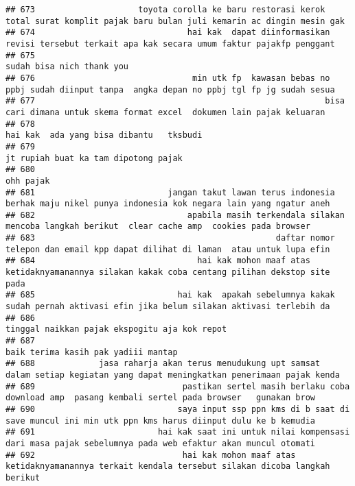 \documentclass[
]{article}
\begin{document}
\begin{verbatim}
## 673                     toyota corolla ke baru restorasi kerok total surat komplit pajak baru bulan juli kemarin ac dingin mesin gak
## 674                               hai kak  dapat diinformasikan revisi tersebut terkait apa kak secara umum faktur pajakfp penggant 
## 675                                                                                                        sudah bisa nich thank you
## 676                                min utk fp  kawasan bebas no ppbj sudah diinput tanpa  angka depan no ppbj tgl fp jg sudah sesua 
## 677                                                           bisa cari dimana untuk skema format excel  dokumen lain pajak keluaran
## 678                                                                                         hai kak  ada yang bisa dibantu   tksbudi
## 679                                                                                            jt rupiah buat ka tam dipotong pajak 
## 680                                                                                                                       ohh pajak 
## 681                           jangan takut lawan terus indonesia berhak maju nikel punya indonesia kok negara lain yang ngatur aneh 
## 682                               apabila masih terkendala silakan mencoba langkah berikut  clear cache amp  cookies pada browser   
## 683                                                 daftar nomor telepon dan email kpp dapat dilihat di laman  atau untuk lupa efin 
## 684                                 hai kak mohon maaf atas ketidaknyamanannya silakan kakak coba centang pilihan dekstop site pada 
## 685                             hai kak  apakah sebelumnya kakak sudah pernah aktivasi efin jika belum silakan aktivasi terlebih da 
## 686                                                                                    tinggal naikkan pajak ekspogitu aja kok repot
## 687                                                                                              baik terima kasih pak yadiii mantap
## 688             jasa raharja akan terus menudukung upt samsat  dalam setiap kegiatan yang dapat meningkatkan penerimaan pajak kenda 
## 689                              pastikan sertel masih berlaku coba download amp  pasang kembali sertel pada browser   gunakan brow 
## 690                             saya input ssp ppn kms di b saat di save muncul ini min utk ppn kms harus diinput dulu ke b kemudia 
## 691                         hai kak saat ini untuk nilai kompensasi dari masa pajak sebelumnya pada web efaktur akan muncul otomati 
## 692                              hai kak mohon maaf atas ketidaknyamanannya terkait kendala tersebut silakan dicoba langkah berikut 

\end{verbatim}
\end{document}
